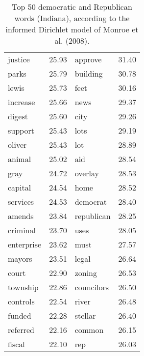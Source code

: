 \begin{table}[ht]
\begin{tabular}{lrlr}
  justice & 25.93 & approve & 31.40 \\ 
  parks & 25.79 & building & 30.78 \\ 
  lewis & 25.73 & feet & 30.16 \\ 
  increase & 25.66 & news & 29.37 \\ 
  digest & 25.60 & city & 29.26 \\ 
  support & 25.43 & lots & 29.19 \\ 
  oliver & 25.43 & lot & 28.89 \\ 
  animal & 25.02 & aid & 28.54 \\ 
  gray & 24.72 & overlay & 28.53 \\ 
  capital & 24.54 & home & 28.52 \\ 
  services & 24.53 & democrat & 28.40 \\ 
  amends & 23.84 & republican & 28.25 \\ 
  criminal & 23.70 & uses & 28.05 \\ 
  enterprise & 23.62 & must & 27.57 \\ 
  mayors & 23.51 & legal & 26.64 \\ 
  court & 22.90 & zoning & 26.53 \\ 
  township & 22.86 & councilors & 26.50 \\ 
  controls & 22.54 & river & 26.48 \\ 
  funded & 22.28 & stellar & 26.40 \\ 
  referred & 22.16 & common & 26.15 \\ 
  fiscal & 22.10 & rep & 26.03 \\ 
   \hline
\end{tabular}
\endgroup
\caption{Top 50 democratic and Republican words (Indiana), according to the informed 
             Dirichlet model of Monroe et al. (2008).} 
\label{tabFightinIN}
\end{table}

